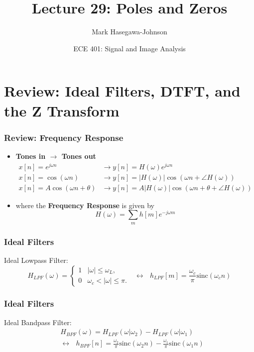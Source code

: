 \documentclass{beamer}
\title{Lecture 29: Poles and Zeros}
\author{Mark Hasegawa-Johnson}
\date{ECE 401: Signal and Image Analysis}
\begin{document}
\begin{frame}
  \maketitle
\end{frame}

\begin{frame}
  \tableofcontents
\end{frame}

\section[Review]{Review: Ideal Filters, DTFT, and the Z Transform}
\setcounter{subsection}{1}

\begin{frame}
  \frametitle{Review: Frequency Response}
  \begin{itemize}
  \item {\bf Tones in $\rightarrow$ Tones out}
    \begin{align*}
      x[n]=e^{j\omega n} &\rightarrow y[n]=H(\omega)e^{j\omega n}\\
      x[n]=\cos\left(\omega n\right)
      &\rightarrow y[n]=|H(\omega)|\cos\left(\omega n+\angle H(\omega)\right)\\
      x[n]=A\cos\left(\omega n+\theta\right)
      &\rightarrow y[n]=A|H(\omega)|\cos\left(\omega n+\theta+\angle H(\omega)\right)
    \end{align*}
  \item where the {\bf Frequency Response} is given by
    \[
    H(\omega) = \sum_m h[m]e^{-j\omega m}
    \]
  \end{itemize}
\end{frame}  


\begin{frame}
  \frametitle{Ideal Filters}
  Ideal Lowpass Filter:
  \[
  H_{LPF}(\omega)
  = \begin{cases} 1& |\omega|\le\omega_L,\\
    0 & \omega_c<|\omega|\le\pi.
  \end{cases}~~~\leftrightarrow~~~
  h_{LPF}[m]=\frac{\omega_c}{\pi}\mbox{sinc}(\omega_c n)
  \]
\end{frame}

\begin{frame}
  \frametitle{Ideal Filters}
  Ideal Bandpass Filter:
  \begin{align*}
    &H_{BPF}(\omega)=H_{LPF}(\omega|\omega_2)-H_{LPF}(\omega|\omega_1)\\
    &\leftrightarrow~~~ h_{BPF}[n]=\frac{\omega_2}{\pi}\mbox{sinc}(\omega_2 n)-
    \frac{\omega_1}{\pi}\mbox{sinc}(\omega_1 n)
  \end{align*}
\end{frame}
\end{document}

